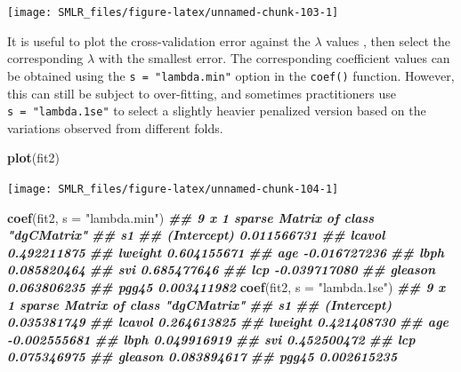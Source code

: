 \documentclass[
]{book}
\newenvironment{Shaded}{\begin{snugshade}}{\end{snugshade}}
\newcommand{\AttributeTok}[1]{\textcolor[rgb]{0.13,0.29,0.53}{#1}}
\newcommand{\DocumentationTok}[1]{\textcolor[rgb]{0.56,0.35,0.01}{\textbf{\textit{#1}}}}
\newcommand{\FunctionTok}[1]{\textcolor[rgb]{0.13,0.29,0.53}{\textbf{#1}}}
\newcommand{\NormalTok}[1]{#1}
\newcommand{\StringTok}[1]{\textcolor[rgb]{0.31,0.60,0.02}{#1}}
\theoremstyle{definition}
\theoremstyle{definition}
\theoremstyle{definition}
\theoremstyle{definition}
\theoremstyle{remark}
\begin{document}
\begin{center}\texttt{[image: SMLR\_files/figure-latex/unnamed-chunk-103-1]} \end{center}

It is useful to plot the cross-validation error against the \(\lambda\) values , then select the corresponding \(\lambda\) with the smallest error. The corresponding coefficient values can be obtained using the \texttt{s\ =\ "lambda.min"} option in the \texttt{coef()} function. However, this can still be subject to over-fitting, and sometimes practitioners use \texttt{s\ =\ "lambda.1se"} to select a slightly heavier penalized version based on the variations observed from different folds.

\begin{Shaded}
\begin{Highlighting}[]
  \FunctionTok{plot}\NormalTok{(fit2)}
\end{Highlighting}
\end{Shaded}

\begin{center}\texttt{[image: SMLR\_files/figure-latex/unnamed-chunk-104-1]} \end{center}

\begin{Shaded}
\begin{Highlighting}[]
  \FunctionTok{coef}\NormalTok{(fit2, }\AttributeTok{s =} \StringTok{"lambda.min"}\NormalTok{)}
\DocumentationTok{\#\# 9 x 1 sparse Matrix of class "dgCMatrix"}
\DocumentationTok{\#\#                       s1}
\DocumentationTok{\#\# (Intercept)  0.011566731}
\DocumentationTok{\#\# lcavol       0.492211875}
\DocumentationTok{\#\# lweight      0.604155671}
\DocumentationTok{\#\# age         {-}0.016727236}
\DocumentationTok{\#\# lbph         0.085820464}
\DocumentationTok{\#\# svi          0.685477646}
\DocumentationTok{\#\# lcp         {-}0.039717080}
\DocumentationTok{\#\# gleason      0.063806235}
\DocumentationTok{\#\# pgg45        0.003411982}
  \FunctionTok{coef}\NormalTok{(fit2, }\AttributeTok{s =} \StringTok{"lambda.1se"}\NormalTok{)}
\DocumentationTok{\#\# 9 x 1 sparse Matrix of class "dgCMatrix"}
\DocumentationTok{\#\#                       s1}
\DocumentationTok{\#\# (Intercept)  0.035381749}
\DocumentationTok{\#\# lcavol       0.264613825}
\DocumentationTok{\#\# lweight      0.421408730}
\DocumentationTok{\#\# age         {-}0.002555681}
\DocumentationTok{\#\# lbph         0.049916919}
\DocumentationTok{\#\# svi          0.452500472}
\DocumentationTok{\#\# lcp          0.075346975}
\DocumentationTok{\#\# gleason      0.083894617}
\DocumentationTok{\#\# pgg45        0.002615235}
\end{Highlighting}
\end{Shaded}
\end{document}
